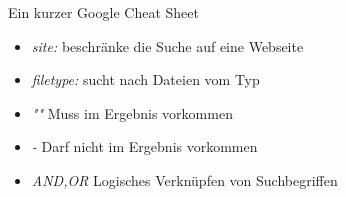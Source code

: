 \begin{frame}{Ein kurzer Google Cheat Sheet}
    \begin{itemize}
        \item \textit{site:} beschränke die Suche auf eine Webseite
        \item \textit{filetype:} sucht nach Dateien vom Typ
        \item \textit{""}  Muss im Ergebnis vorkommen
        \item \textit{-} Darf nicht im Ergebnis vorkommen
        \item \textit{AND,OR} Logisches Verknüpfen von Suchbegriffen
    \end{itemize}
\end{frame}
